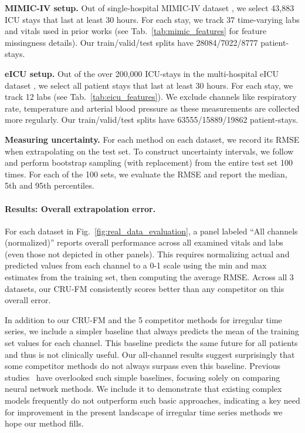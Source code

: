 \textbf{MIMIC-IV setup.} 
 Out of single-hospital MIMIC-IV dataset \citep{johnson2020mimic}, we select 
 43,883 ICU stays that last at least 30 hours.
For each stay, we track 37 time-varying labs and vitals used in prior works \citep{Gong, Nestor} (see Tab.~\ref{tab:mimic_features} for feature missingness details).
Our train/valid/test splits have 28084/7022/8777 patient-stays. 




\textbf{eICU setup.} 
 Out of the over 200,000 ICU-stays in the multi-hospital eICU dataset \citep{johnson2020mimic}, we select 
 all patient stays that last at least 30 hours.
For each stay, we track 12 labs (see Tab.~\ref{tab:eicu_features}).
We exclude channels like respiratory rate, temperature and arterial blood pressure as these measurements are collected more regularly.
Our train/valid/test splits have 63555/15889/19862 patient-stays. 



\textbf{Measuring uncertainty.}
For each method on each dataset, we record its RMSE when extrapolating on the test set. To construct uncertainty intervals, we follow \citet{raschka2018model} and perform bootstrap sampling (with replacement) from the entire test set 100 times. For each of the 100 sets, we evaluate the RMSE and report the median, 5th and 95th percentiles.

\paragraph{Results: Overall extrapolation error.}
For each dataset in Fig.~\ref{fig:real_data_evaluation}, a panel labeled ``All channels (normalized)'' reports  overall performance across all examined vitals and labs (even those not depicted in other panels).
This requires normalizing actual and predicted values from each channel to a 0-1 scale using the min and max estimates from the training set, then computing the average RMSE.
Across all 3 datasets, our CRU-FM consistently scores better than any competitor on this overall error.



In addition to our CRU-FM and the 5 competitor methods for irregular time series, we include a simpler baseline that always predicts the mean of the training set values for each channel. 
This baseline predicts the same future for all patients and thus is not clinically useful.
Our all-channel results suggest surprisingly that some competitor methods do not always surpass even this baseline.
Previous studies~\citep{shukla2021multitime, rubanova2019latent} have overlooked such simple baselines, focusing solely on comparing neural network methods. We include it to demonstrate that existing complex models frequently do not outperform such basic approaches, indicating a key need for improvement in the present landscape of irregular time series methods we hope our method fills.

